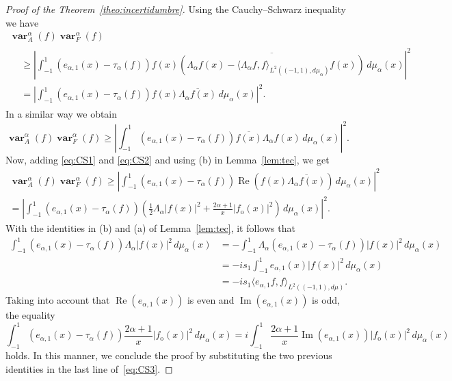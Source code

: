 \documentclass[a4paper]{amsart}
\theoremstyle{plain}
\theoremstyle{definition}
\renewcommand{\Im}{\operatorname{Im}}
\renewcommand{\Re}{\operatorname{Re}}
\newcommand{\varneg}{\operatorname{\mathbf{var}}}
\begin{document}
\begin{proof}[Proof of the Theorem~\ref{theo:incertidumbre}]
Using the Cauchy--Schwarz inequality we have
\begin{multline}
\label{eq:CS1}
\varneg_A^\alpha(f)\varneg_F^\alpha(f)\\
\begin{aligned}
&\ge \left|\int_{-1}^1 (e_{\alpha,1}(x)-\tau_{\alpha}(f))f(x)
\overline{(\Lambda_\alpha f(x)
-\langle \Lambda_\alpha f, f\rangle_{L^2((-1,1),d\mu_\alpha)}f(x))}\,d\mu_{\alpha}(x)\right|^2\\
&= \left|\int_{-1}^1 (e_{\alpha,1}(x) - \tau_{\alpha}(f))f(x)
\overline{\Lambda_\alpha f(x)}\,d\mu_{\alpha}(x)\right|^2.
\end{aligned}
\end{multline}
In a similar way we obtain
\begin{equation}
\label{eq:CS2}
\varneg_A^\alpha(f)\varneg_F^\alpha(f)
\ge \left|\int_{-1}^1 (e_{\alpha,1}(x) - \tau_{\alpha}(f))
\overline{f(x)}\Lambda_\alpha f(x)\,d\mu_{\alpha}(x)\right|^2.
\end{equation}
Now, adding \eqref{eq:CS1} and \eqref{eq:CS2} and using (b) in Lemma~\ref{lem:tec}, we get
\begin{multline}
\label{eq:CS3}
\varneg_A^\alpha(f)\varneg_F^\alpha(f)
\ge  \left|\int_{-1}^1 (e_{\alpha,1}(x) - \tau_{\alpha}(f))\Re(f(x)
\overline{\Lambda_\alpha f(x)})\,d\mu_{\alpha}(x)\right|^2\\
= \left|\int_{-1}^1 (e_{\alpha,1}(x) - \tau_{\alpha}(f))
\left(\frac12\Lambda_\alpha |f(x)|^2 + \frac{2\alpha+1}{x}
|f_\text{o}(x)|^2\right)\,d\mu_{\alpha}(x)\right|^2.
\end{multline}
With the identities in (b) and (a) of Lemma~\ref{lem:tec}, it follows that
\begin{align*}
\int_{-1}^1 (e_{\alpha,1}(x)-\tau_{\alpha}(f)) \Lambda_\alpha |f(x)|^2\,d\mu_{\alpha}(x)
&= -\int_{-1}^1 \Lambda_\alpha(e_{\alpha,1}(x) - \tau_{\alpha}(f)) |f(x)|^2\,d\mu_{\alpha}(x)\\
&= -i s_1 \int_{-1}^1 e_{\alpha,1}(x)|f(x)|^2\,d\mu_{\alpha}(x)\\
&=-is_1 \langle e_{\alpha,1}f,f \rangle_{L^2((-1,1),d\mu)}.
\end{align*}
Taking into account that $\Re(e_{\alpha,1}(x))$ is even and $\Im(e_{\alpha,1}(x))$ is odd, the equality
\[
\int_{-1}^1 (e_{\alpha,1}(x)-\tau_{\alpha}(f))
\frac{2\alpha+1}{x}|f_\text{o}(x)|^2\,d\mu_{\alpha}(x)
= i\int_{-1}^1 \frac{2\alpha+1}{x}\Im(e_{\alpha,1}(x)) |f_\text{o}(x)|^2\,d\mu_{\alpha}(x)
\]
holds. In this manner, we conclude the proof by substituting the two previous identities in the last line of~\eqref{eq:CS3}.
\end{proof}
\end{document}
